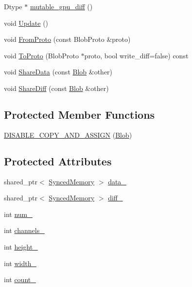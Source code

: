 \begin{DoxyCompactItemize}
Dtype $\ast$ \hyperlink{classcaffe_1_1_blob_a8d230bed098a5ee31559df0b8e2db252}{mutable\+\_\+gpu\+\_\+diff} ()
\item 
void \hyperlink{classcaffe_1_1_blob_afe035d7b60c56e4aed2a18296e8ffdc5}{Update} ()
\item 
void \hyperlink{classcaffe_1_1_blob_aa8b8ccc2dc4c68f07b2257d69cb4bc90}{From\+Proto} (const Blob\+Proto \&proto)
\item 
void \hyperlink{classcaffe_1_1_blob_ad297f6b6cad67200c3b5201034653271}{To\+Proto} (Blob\+Proto $\ast$proto, bool write\+\_\+diff=false) const 
\item 
void \hyperlink{classcaffe_1_1_blob_a8fce5a816a2b9629686db69108610d93}{Share\+Data} (const \hyperlink{classcaffe_1_1_blob}{Blob} \&other)
\item 
void \hyperlink{classcaffe_1_1_blob_a004781965b09f94c409cec9a6fc7c35c}{Share\+Diff} (const \hyperlink{classcaffe_1_1_blob}{Blob} \&other)
\end{DoxyCompactItemize}
\subsection*{Protected Member Functions}
\begin{DoxyCompactItemize}
\item 
\hyperlink{classcaffe_1_1_blob_a603f1a5472e5fae9ca8fec62f6d5c581}{D\+I\+S\+A\+B\+L\+E\+\_\+\+C\+O\+P\+Y\+\_\+\+A\+N\+D\+\_\+\+A\+S\+S\+I\+G\+N} (\hyperlink{classcaffe_1_1_blob}{Blob})
\end{DoxyCompactItemize}
\subsection*{Protected Attributes}
\begin{DoxyCompactItemize}
\item 
shared\+\_\+ptr$<$ \hyperlink{classcaffe_1_1_synced_memory}{Synced\+Memory} $>$ \hyperlink{classcaffe_1_1_blob_a5240277a3cea1bc530deca40ca0d0e16}{data\+\_\+}
\item 
shared\+\_\+ptr$<$ \hyperlink{classcaffe_1_1_synced_memory}{Synced\+Memory} $>$ \hyperlink{classcaffe_1_1_blob_a9310f9007aa45e529cb6d69d32dbb80c}{diff\+\_\+}
\item 
int \hyperlink{classcaffe_1_1_blob_a1af8433c8c66ae8f2732aa4d102b6c29}{num\+\_\+}
\item 
int \hyperlink{classcaffe_1_1_blob_a7618f913659955dcee178c00a842065c}{channels\+\_\+}
\item 
int \hyperlink{classcaffe_1_1_blob_ada72205fe499a098a6d17b4b1cd34a82}{height\+\_\+}
\item 
int \hyperlink{classcaffe_1_1_blob_a5ea591a12504b44d94e3715d88fb37a9}{width\+\_\+}
\item 
int \hyperlink{classcaffe_1_1_blob_acf06ea13a3a14f77c178a525c35a3ea0}{count\+\_\+}
\end{DoxyCompactItemize}


